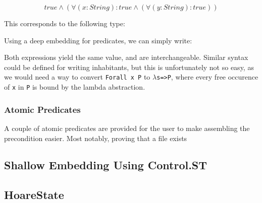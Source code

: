 \documentclass[11pt,a4paper]{article}
\newcommand{\Conid}[1]{\mathit{#1}}
\newcommand{\Varid}[1]{\mathit{#1}}
\def\resethooks{%
  \global\let\SaveRestoreHook\empty
  \global\let\ColumnHook\empty}
\let\hspre\empty
\let\hspost\empty
\begin{document}
\begin{equation*}
true \land (\forall (x:String):true \land (\forall (y:String):true)) 
\end{equation*}

This corresponds to the following type:

\resethooks

Using a deep embedding for predicates, we can simply write: 

\resethooks

Both expressions yield the same value, and are interchangeable. Similar syntax could be defined for writing inhabitants, but this is unfortunately not so easy, as we would need a way to convert \texttt{Forall x P} to \texttt{$\lambda$s=>P}, where every free occurence of \texttt{x} in \texttt{P} is bound by the lambda abstraction. 

\subsubsection{Atomic Predicates}

A couple of atomic predicates are provided for the user to make assembling the precondition easier. Most notably, proving that a file exists 

\subsection{Shallow Embedding Using Control.ST}

\subsection{HoareState}
\end{document}
